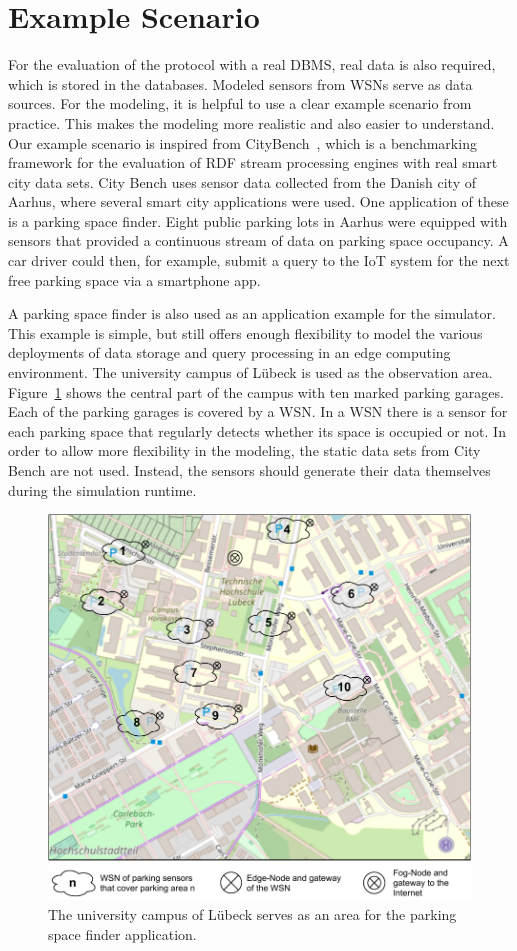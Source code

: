 \documentclass[english,version-2019-11]{uzl-thesis}
\begin{document}
\section{Example Scenario}
\label{section_Scenario}
For the evaluation of the protocol with a real DBMS, real data is also required, which is stored in the databases. Modeled sensors from WSNs serve as data sources. For the modeling, it is helpful to use a clear example scenario from practice. This makes the modeling more realistic and also easier to understand. Our example scenario is inspired from CityBench~\cite{CityBench}, which is a benchmarking framework for the evaluation of RDF stream processing engines with real smart city data sets. City Bench uses sensor data collected from the Danish city of Aarhus, where several smart city applications were used. One application of these is a parking space finder. Eight public parking lots in Aarhus were equipped with sensors that provided a continuous stream of data on parking space occupancy. A car driver could then, for example, submit a query to the IoT system for the next free parking space via a smartphone app.

A parking space finder is also used as an application example for the simulator. This example is simple, but still offers enough flexibility to model the various deployments of data storage and query processing in an edge computing environment. The university campus of L{\"u}beck is used as the observation area. Figure~\ref{figure_campus} shows the central part of the campus with ten marked parking garages. Each of the parking garages is covered by a WSN. In a WSN there is a sensor for each parking space that regularly detects whether its space is occupied or not. In order to allow more flexibility in the modeling, the static data sets from City Bench are not used. Instead, the sensors should generate their data themselves during the simulation runtime.
\begin{figure}[htpb]
  \centering
  \includegraphics{campus.pdf}
  \caption{The university campus of L{\"u}beck serves as an area for the parking space finder application.}
  \label{figure_campus}
\end{figure}
\end{document}
